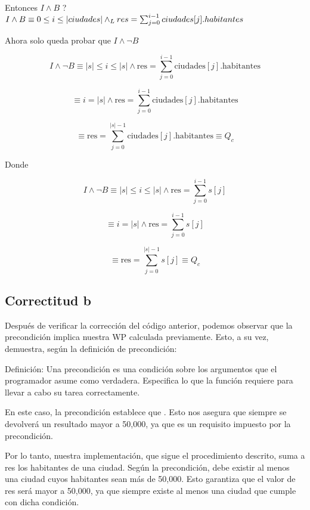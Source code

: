 \documentclass[10pt,a4paper]{article}
\begin{document}
Entonces $\ensuremath{I \land B}$  \implica {}? \\

${I \land B}  \equiv  0 \leq i \leq |ciudades|  \land _L res = \sum_{j=0}^{i-1} ciudades[j].habitantes $


Ahora solo queda probar que  $I \land \neg B$

\[
I \land \neg B \equiv |s| \leq i \leq |s| \land \text{res} = \sum_{j=0}^{i-1} \text{ciudades}[j].\text{habitantes}
\]

\[
\equiv i = |s| \land \text{res} = \sum_{j=0}^{i-1} \text{ciudades}[j].\text{habitantes}
\]

\[
\equiv \text{res} = \sum_{j=0}^{|s|-1} \text{ciudades}[j].\text{habitantes} \equiv Q_c
\]

Donde

\[
I \land \neg B \equiv |s| \leq i \leq |s| \land \text{res} = \sum_{j=0}^{i-1} s[j]
\]

\[
\equiv i = |s| \land \text{res} = \sum_{j=0}^{i-1} s[j]
\]

\[
\equiv \text{res} = \sum_{j=0}^{|s|-1} s[j] \equiv Q_c
\]

\subsection{Correctitud b}
Después de verificar la corrección del código anterior, podemos observar que la precondición implica nuestra WP calculada previamente. Esto, a su vez, demuestra, según la definición de precondición:

Definición: Una precondición es una condición sobre los argumentos que el programador asume como verdadera. Especifica lo que la función requiere para llevar a cabo su tarea correctamente.

En este caso, la precondición establece que . Esto nos asegura que siempre se devolverá un resultado mayor a 50,000, ya que es un requisito impuesto por la precondición.

Por lo tanto, nuestra implementación, que sigue el procedimiento descrito, suma a res los habitantes de una ciudad. Según la precondición, debe existir al menos una ciudad cuyos habitantes sean más de 50,000. Esto garantiza que el valor de res será mayor a 50,000, ya que siempre existe al menos una ciudad que cumple con dicha condición.
\end{document}
